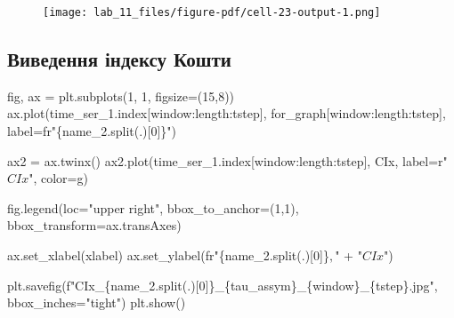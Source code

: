 \documentclass[
  letterpaper,
]{report}
\newenvironment{Shaded}{\begin{snugshade}}{\end{snugshade}}
\newcommand{\DecValTok}[1]{\textcolor[rgb]{0.68,0.00,0.00}{#1}}
\newcommand{\NormalTok}[1]{\textcolor[rgb]{0.00,0.23,0.31}{#1}}
\newcommand{\OperatorTok}[1]{\textcolor[rgb]{0.37,0.37,0.37}{#1}}
\newcommand{\SpecialCharTok}[1]{\textcolor[rgb]{0.37,0.37,0.37}{#1}}
\newcommand{\SpecialStringTok}[1]{\textcolor[rgb]{0.13,0.47,0.30}{#1}}
\newcommand{\StringTok}[1]{\textcolor[rgb]{0.13,0.47,0.30}{#1}}
\newcommand{\VerbatimStringTok}[1]{\textcolor[rgb]{0.13,0.47,0.30}{#1}}
\begin{document}
\begin{figure}[H]

{\centering \texttt{[image: lab\_11\_files/figure-pdf/cell-23-output-1.png]}

}

\end{figure}

\hypertarget{ux432ux438ux432ux435ux434ux435ux43dux43dux44f-ux456ux43dux434ux435ux43aux441ux443-ux43aux43eux448ux442ux438-1}{%
\subsection{Виведення індексу
Кошти}\label{ux432ux438ux432ux435ux434ux435ux43dux43dux44f-ux456ux43dux434ux435ux43aux441ux443-ux43aux43eux448ux442ux438-1}}

\begin{Shaded}
\begin{Highlighting}[]
\NormalTok{fig, ax }\OperatorTok{=}\NormalTok{ plt.subplots(}\DecValTok{1}\NormalTok{, }\DecValTok{1}\NormalTok{, figsize}\OperatorTok{=}\NormalTok{(}\DecValTok{15}\NormalTok{,}\DecValTok{8}\NormalTok{))}
\NormalTok{ax.plot(time\_ser\_1.index[window:length:tstep], for\_graph[window:length:tstep], label}\OperatorTok{=}\VerbatimStringTok{fr"}\SpecialCharTok{\{}\NormalTok{name\_2}\SpecialCharTok{.}\NormalTok{split(}\StringTok{\textquotesingle{}.\textquotesingle{}}\NormalTok{)[}\DecValTok{0}\NormalTok{]}\SpecialCharTok{\}}\VerbatimStringTok{"}\NormalTok{)}

\NormalTok{ax2 }\OperatorTok{=}\NormalTok{ ax.twinx()}
\NormalTok{ax2.plot(time\_ser\_1.index[window:length:tstep], CIx, label}\OperatorTok{=}\VerbatimStringTok{r"$ CIx $"}\NormalTok{, color}\OperatorTok{=}\StringTok{\textquotesingle{}g\textquotesingle{}}\NormalTok{)}

\NormalTok{fig.legend(loc}\OperatorTok{=}\StringTok{"upper right"}\NormalTok{, bbox\_to\_anchor}\OperatorTok{=}\NormalTok{(}\DecValTok{1}\NormalTok{,}\DecValTok{1}\NormalTok{), bbox\_transform}\OperatorTok{=}\NormalTok{ax.transAxes)}

\NormalTok{ax.set\_xlabel(xlabel)}
\NormalTok{ax.set\_ylabel(}\VerbatimStringTok{fr"}\SpecialCharTok{\{}\NormalTok{name\_2}\SpecialCharTok{.}\NormalTok{split(}\StringTok{\textquotesingle{}.\textquotesingle{}}\NormalTok{)[}\DecValTok{0}\NormalTok{]}\SpecialCharTok{\}}\VerbatimStringTok{$,$"} \OperatorTok{+} \StringTok{"$CIx$"}\NormalTok{)}

\NormalTok{plt.savefig(}\SpecialStringTok{f"CIx\_}\SpecialCharTok{\{}\NormalTok{name\_2}\SpecialCharTok{.}\NormalTok{split(}\StringTok{\textquotesingle{}.\textquotesingle{}}\NormalTok{)[}\DecValTok{0}\NormalTok{]}\SpecialCharTok{\}}\SpecialStringTok{\_}\SpecialCharTok{\{}\NormalTok{tau\_assym}\SpecialCharTok{\}}\SpecialStringTok{\_}\SpecialCharTok{\{}\NormalTok{window}\SpecialCharTok{\}}\SpecialStringTok{\_}\SpecialCharTok{\{}\NormalTok{tstep}\SpecialCharTok{\}}\SpecialStringTok{.jpg"}\NormalTok{, bbox\_inches}\OperatorTok{=}\StringTok{"tight"}\NormalTok{)}
\NormalTok{plt.show()}
\end{Highlighting}
\end{Shaded}
\end{document}
